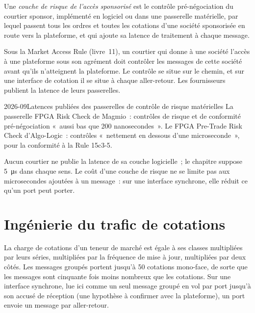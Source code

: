 \begin{definition}\label{def:nw:equities-and-options-connectivity:risk}
Une \emph{couche de risque de l'accès sponsorisé} est le contrôle pré-négociation du courtier sponsor, implémenté en logiciel
ou dans une passerelle matérielle, par lequel passent tous les ordres et toutes les cotations d'une société sponsorisée en route vers la plateforme, et
qui ajoute sa latence de traitement à chaque message.
\end{definition}

Sous la Market Access Rule (livre~11), un courtier qui donne à une société l'accès à une plateforme sous son agrément doit contrôler
les messages de cette société avant qu'ils n'atteignent la plateforme. Le contrôle se situe sur le chemin, et sur une interface de cotation il se situe à chaque
aller-retour. Les fournisseurs publient la latence de leurs passerelles.

\begin{dated}{2026-09}{Latences publiées des passerelles de contrôle de risque matérielles}\label{dat:nw:equities-and-options-connectivity:risk}
La passerelle FPGA Risk Check de Magmio~: contrôles de risque et de conformité pré-négociation «~aussi bas que 200 nanosecondes~». Le FPGA
Pre-Trade Risk Check d'Algo-Logic~: contrôles «~nettement en dessous d'une microseconde~», pour la conformité à la Rule 15c3-5.
\end{dated}

Aucun courtier ne publie la latence de sa couche logicielle~; le chapitre suppose \qty{5}{\micro\second} dans chaque sens. Le coût d'une
couche de risque ne se limite pas aux microsecondes ajoutées à un message~: sur une interface synchrone, elle réduit ce qu'un port peut porter.

\section{Ingénierie du trafic de cotations}

La charge de cotations d'un teneur de marché est égale à ses classes multipliées par leurs séries, multipliées par la fréquence de mise à jour, multipliées par deux côtés. Les messages groupés portent
jusqu'à 50 cotations mono-face, de sorte que les messages sont cinquante fois moins nombreux que les cotations. Sur une interface synchrone, lue ici comme un
seul message groupé en vol par port jusqu'à son accusé de réception (une hypothèse à confirmer avec la plateforme), un port envoie un
message par aller-retour.

